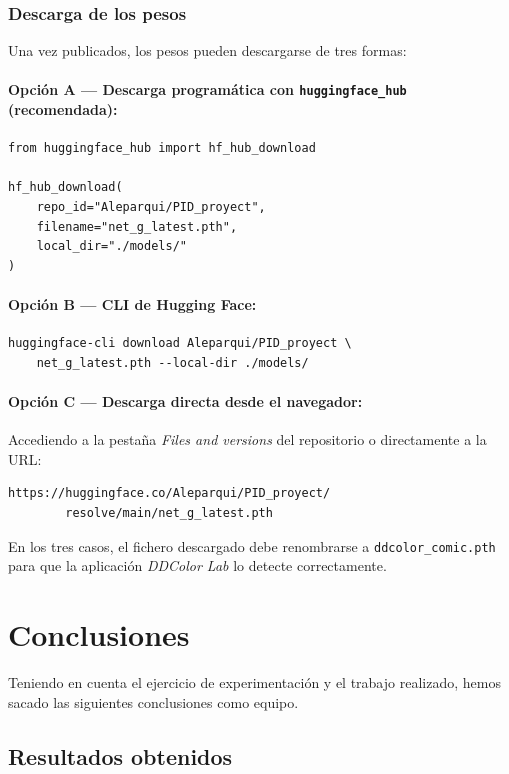 \documentclass[a4paper]{article}
\begin{document}
\subsubsection{Descarga de los pesos}

Una vez publicados, los pesos pueden descargarse de tres formas:

\paragraph{Opción A --- Descarga programática con \texttt{huggingface\_hub} (recomendada):}
\begin{verbatim}
from huggingface_hub import hf_hub_download

hf_hub_download(
    repo_id="Aleparqui/PID_proyect",
    filename="net_g_latest.pth",
    local_dir="./models/"
)
\end{verbatim}

\paragraph{Opción B --- CLI de Hugging Face:}
\begin{verbatim}
huggingface-cli download Aleparqui/PID_proyect \
    net_g_latest.pth --local-dir ./models/
\end{verbatim}

\paragraph{Opción C --- Descarga directa desde el navegador:}

Accediendo a la pestaña \textit{Files and versions} del repositorio o directamente a la URL:
\begin{verbatim}
https://huggingface.co/Aleparqui/PID_proyect/
        resolve/main/net_g_latest.pth
\end{verbatim}

En los tres casos, el fichero descargado debe renombrarse a \texttt{ddcolor\_comic.pth} para que la aplicación \textit{DDColor Lab} lo detecte correctamente.

\section{Conclusiones}

Teniendo en cuenta el ejercicio de experimentación y el trabajo realizado, hemos sacado las siguientes conclusiones como equipo.

\subsection{Resultados obtenidos}
\end{document}
